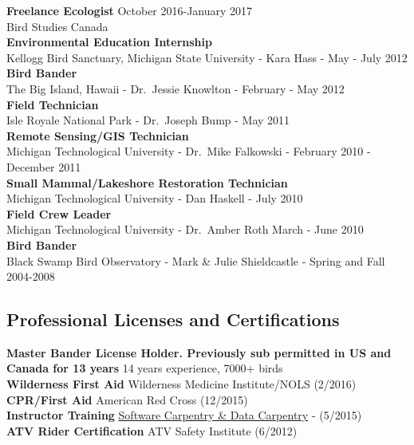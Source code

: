\documentclass[]{article}
\begin{document}
\textbf{Freelance Ecologist} October 2016-January 2017\\
Bird Studies Canada\\
\textbf{Environmental Education Internship}\\
Kellogg Bird Sanctuary, Michigan State University - Kara Hass - May -
July 2012\\
\textbf{Bird Bander}\\
The Big Island, Hawaii - Dr.~Jessie Knowlton - February - May 2012\\
\textbf{Field Technician}\\
Isle Royale National Park - Dr.~Joseph Bump - May 2011\\
\textbf{Remote Sensing/GIS Technician}\\
Michigan Technological University - Dr.~Mike Falkowski - February 2010 -
December 2011\\
\textbf{Small Mammal/Lakeshore Restoration Technician}\\
Michigan Technological University - Dan Haskell - July 2010\\
\textbf{Field Crew Leader}\\
Michigan Technological University - Dr.~Amber Roth March - June 2010\\
\textbf{Bird Bander}\\
Black Swamp Bird Observatory - Mark \& Julie Shieldcastle - Spring and
Fall 2004-2008

\subsection{Professional Licenses and
Certifications}\label{professional-licenses-and-certifications}

\textbf{Master Bander License Holder. Previously sub permitted in US and
Canada for 13 years} 14 years experience, 7000+ birds\\
\textbf{Wilderness First Aid} Wilderness Medicine Institute/NOLS
(2/2016)\\
\textbf{CPR/First Aid} American Red Cross (12/2015)\\
\textbf{Instructor Training}
\href{https://software-carpentry.org/index.html}{Software Carpentry \&
Data Carpentry} - (5/2015)\\
\textbf{ATV Rider Certification} ATV Safety Institute (6/2012)
\end{document}
